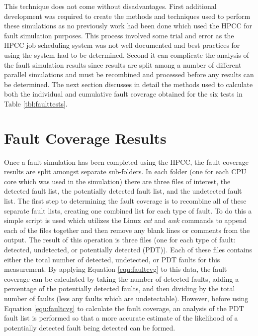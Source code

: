 \documentclass[12pt]{report}
\begin{document}
This technique does not come without disadvantages.  First additional development was required to create the methods and techniques used to perform these simulations as no previously work had been done which used the HPCC for fault simulation purposes.  This process involved some trial and error as the HPCC job scheduling system was not well documented and best practices for using the system had to be determined.  Second it can complicate the analysis of the fault simulation results since results are split among a number of different parallel simulations and must be recombined and processed before any results can be determined.  The next section discusses in detail the methods used to calculate both the individual and cumulative fault coverage obtained for the six tests in Table \ref{tbl:faulttests}.

\section{Fault Coverage Results}
Once a fault simulation has been completed using the HPCC, the fault coverage results are split amongst separate sub-folders.  In each folder (one for each CPU core which was used in the simulation) there are three files of interest, the detected fault list, the potentially detected fault list, and the undetected fault list.  The first step to determining the fault coverage is to recombine all of these separate fault lists, creating one combined list for each type of fault.  To do this a simple script is used which utilizes the Linux \textit{cat} and \textit{awk} commands to append each of the files together and then remove any blank lines or comments from the output.  The result of this operation is three files (one for each type of fault: detected, undetected, or potentially detected (PDT)).  Each of these files contains either the total number of detected, undetected, or PDT faults for this measurement.  By applying Equation \ref{equ:faultcvg} to this data, the fault coverage can be calculated by taking the number of detected faults, adding a percentage of the potentially detected faults, and then dividing by the total number of faults (less any faults which are undetectable).  However, before using Equation \ref{equ:faultcvg} to calculate the fault coverage, an analysis of the PDT fault list is performed so that a more accurate estimate of the likelihood of a potentially detected fault being detected can be formed.
\end{document}
